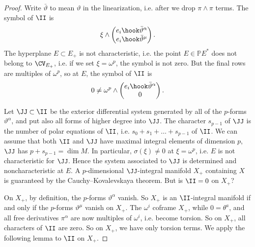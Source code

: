 \begin{proof}
Write \(\bar\vartheta\) to mean \(\vartheta\) in the linearization, i.e. after we drop \(\pi\wedge\pi\) terms.
The symbol of \(\II\) is 
\[
\xi \wedge 
\begin{pmatrix}
e_i \hook \bar\vartheta^{\alpha}\\
e_i\hook \bar\vartheta^{\mu}
\end{pmatrix}.
\]
The hyperplane \(E\subset E_+\) is not characteristic, i.e. the point \(E \in \mathbb{P}E^*\) does not belong to \(\CV_{E_+}\), i.e. if we set \(\xi=\omega^p\), the symbol is not zero.
But the final rows are multiples of \(\omega^p\), so at \(E\), the symbol of \(\II\) is 
\[
0\ne
\omega^p \wedge 
\begin{pmatrix}
e_i \hook \bar\vartheta^{\alpha}\\
0
\end{pmatrix}.
\]

Let \(\JJ\subset \II\) be the exterior differential system generated by all of the \(p\)-forms \(\vartheta^{\alpha}\), and put also all forms of higher degree into \(\JJ\).
The character \(s_{p-1}\) of \(\JJ\) is the number of polar equations of \(\II\), i.e. \(s_0+s_1+\dots+s_{p-1}\) of \(\II\).
We can assume that both \(\II\) and \(\JJ\) have maximal integral elements of dimension \(p\), \(\JJ\) has \(p+s_{p-1}=\dim M\).
In particular, \(\sigma(\xi)\ne 0\) at \(\xi=\omega^p\), i.e. \(E\) is not characteristic for \(\JJ\).
Hence the system associated to \(\JJ\) is determined and noncharacteristic at \(E\).
A \(p\)-dimensional \(\JJ\)-integral manifold \(X_+\) containing \(X\) is guaranteed by the Cauchy--Kovalevskaya theorem.
But is \(\II=0\) on \(X_+\)?

On \(X_+\), by definition, the \(p\)-forms \(\vartheta^{\alpha}\) vanish.
So \(X_+\) is an \(\II\)-integral manifold if and only if the \(p\)-forms \(\vartheta^{\mu}\) vanish on \(X_+\).
The \(\omega^i\) coframe \(X_+\), while \(0=\theta^a\), and all free derivatives \(\pi^{\alpha}\) are now multiples of \(\omega^i\), i.e. become torsion.
So on \(X_+\), all characters of \(\II\) are zero.
So on \(X_+\), we have only torsion terms.
We apply the following lemma to \(\II\) on \(X_+\).
\end{proof}


